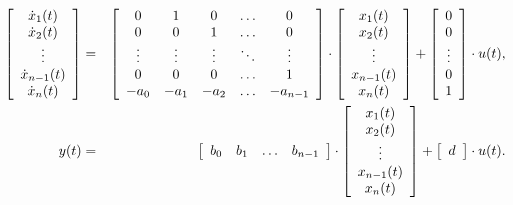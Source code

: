 \begin{eqnarray*}
\left [ 
\begin{array}{c}
\dot{x}_1(t)\\
\dot{x}_2(t)\\
\vdots\\
\dot{x}_{n-1}(t)\\
\dot{x}_{n}(t)\\
\end{array}
\right ] &=&
\left [ 
\begin{array}{c c c c c}
0 & 1 & 0 & \ldots & 0\\
0 & 0 & 1 & \ldots & 0\\
\vdots & \vdots & \vdots & \ddots & \vdots\\
0 & 0 & 0 & \ldots & 1\\
-a_0 & -a_1 & -a_2 & \ldots & -a_{n-1}\\
\end{array}
\right ]\cdot
\left [ 
\begin{array}{c}
x_1(t)\\
x_2(t)\\
\vdots \\
x_{n-1}(t)\\
x_{n}(t)\\
\end{array}
\right ]+
\left [ 
\begin{array}{c}
0 \\
0\\
\vdots\\
0\\
1\\
\end{array}
\right ]\cdot
u(t),\\
y(t) &= &
\left [ 
\begin{array}{c c c c}
b_0 & b_1 & \ldots & b_{n-1}\\
\end{array}
\right ] \cdot
\left [ 
\begin{array}{c}
x_1(t)\\
x_2(t)\\
\vdots \\
x_{n-1}(t)\\
x_{n}(t)\\
\end{array}
\right ]+
\left [ 
\begin{array}{c}
d \\
\end{array}
\right ] \cdot
u(t).
\end{eqnarray*}
\normalsize



